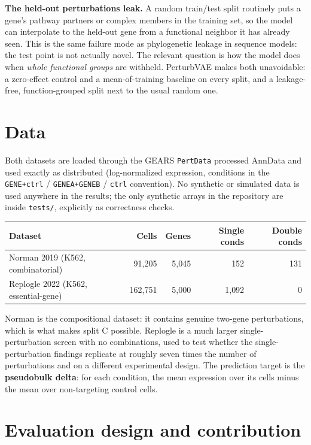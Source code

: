 \documentclass[11pt]{article}
\begin{document}
\textbf{The held-out perturbations leak.} A random train/test split routinely
puts a gene's pathway partners or complex members in the training set, so the
model can interpolate to the held-out gene from a functional neighbor it has
already seen. This is the same failure mode as phylogenetic leakage in sequence
models: the test point is not actually novel. The relevant question is how the
model does when \emph{whole functional groups} are withheld. PerturbVAE makes
both unavoidable: a zero-effect control and a mean-of-training baseline on every
split, and a leakage-free, function-grouped split next to the usual random one.

\section{Data}

Both datasets are loaded through the GEARS \texttt{PertData} processed AnnData and
used exactly as distributed (log-normalized expression, conditions in the
\texttt{GENE+ctrl} / \texttt{GENEA+GENEB} / \texttt{ctrl} convention). No synthetic
or simulated data is used anywhere in the results; the only synthetic arrays in
the repository are inside \texttt{tests/}, explicitly as correctness checks.

\begin{center}
\begin{tabular}{@{}lrrrr@{}}
\toprule
Dataset & Cells & Genes & Single conds & Double conds \\
\midrule
Norman 2019 (K562, combinatorial) & 91{,}205 & 5{,}045 & 152 & 131 \\
Replogle 2022 (K562, essential-gene) & 162{,}751 & 5{,}000 & 1{,}092 & 0 \\
\bottomrule
\end{tabular}
\end{center}

Norman is the compositional dataset: it contains genuine two-gene perturbations,
which is what makes split C possible. Replogle is a much larger
single-perturbation screen with no combinations, used to test whether the
single-perturbation findings replicate at roughly seven times the number of
perturbations and on a different experimental design. The prediction target is
the \textbf{pseudobulk delta}: for each condition, the mean expression over its
cells minus the mean over non-targeting control cells.

\section{Evaluation design and contribution}
\end{document}
